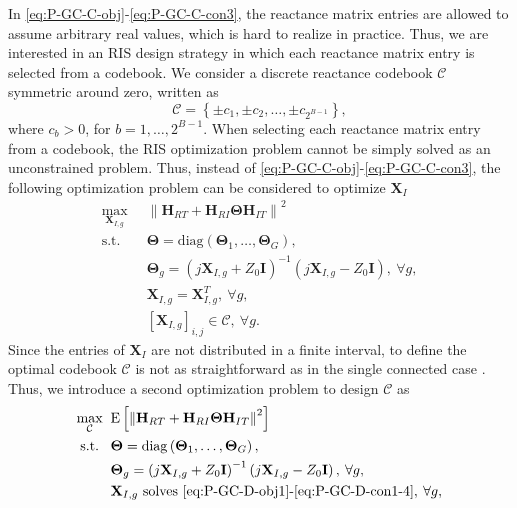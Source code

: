 \documentclass[twocolumn,10pt]{IEEEtran}
\begin{document}
In \eqref{eq:P-GC-C-obj}-\eqref{eq:P-GC-C-con3}, the reactance matrix entries are allowed to assume arbitrary real values, which is hard to realize in practice.
Thus, we are interested in an RIS design strategy in which each reactance matrix entry is selected from a codebook.
We consider a discrete reactance codebook $\mathcal{C}$ symmetric around zero, written as
\begin{equation}
\mathcal{C} = \left\{\pm c_{1},\pm c_{2},\ldots,\pm c_{2^{B-1}}\right\},\label{eq:codebook}
\end{equation}
where $c_{b}>0$, for $b=1,\ldots,2^{B-1}$.
When selecting each reactance matrix entry from a codebook, the RIS optimization problem cannot be simply solved as an unconstrained problem.
Thus, instead of \eqref{eq:P-GC-C-obj}-\eqref{eq:P-GC-C-con3}, the following optimization problem can be considered to optimize $\mathbf{X}_{I}$
\begin{align}
\underset{\mathbf{X}_{I,g}}{\mathsf{\mathrm{max}}}\;\;
& \left\|\mathbf{H}_{RT}+\mathbf{H}_{RI}\boldsymbol{\Theta}\mathbf{H}_{IT}\right\|^{2}\label{eq:P-GC-D-obj1}\\
\mathsf{\mathrm{s.t.}}\;\;\;
& \boldsymbol{\Theta}=\mathrm{diag}\left(\boldsymbol{\Theta}_{1},\ldots,\boldsymbol{\Theta}_{G}\right),\label{eq:P-GC-D-con1-1}\\
& \boldsymbol{\Theta}_{g}=\left(j\mathbf{X}_{I,g}+Z_{0}\mathbf{I}\right)^{-1}\left(j\mathbf{X}_{I,g}-Z_{0}\mathbf{I}\right),\:\forall g,\label{eq:P-GC-D-con1-2}\\
& \mathbf{X}_{I,g}=\mathbf{X}_{I,g}^{T},\:\forall g,\label{eq:P-GC-D-con1-3}\\
& \left[\mathbf{X}_{I,g}\right]_{i,j}\in\mathcal{C},\:\forall g.\label{eq:P-GC-D-con1-4}
\end{align}
Since the entries of $\mathbf{X}_{I}$ are not distributed in a finite interval, to define the optimal codebook $\mathcal{C}$ is not as straightforward as in the single connected case \cite{wu21}.
Thus, we introduce a second optimization problem to design $\mathcal{C}$ as
\begin{align}
\underset{\mathcal{C}}{\mathsf{\mathrm{max}}}\;\;
& \mathrm{E}\left[\left\|\mathbf{H}_{RT}+\mathbf{H}_{RI}\boldsymbol{\Theta}\mathbf{H}_{IT}\right\|^{2}\right]\label{eq:P-GC-D-obj2}\\
\mathsf{\mathrm{s.t.}}\;\;\;
& \boldsymbol{\Theta}=\mathrm{diag}\left(\boldsymbol{\Theta}_{1},\ldots,\boldsymbol{\Theta}_{G}\right),\label{eq:P-GC-D-con2-1}\\
& \boldsymbol{\Theta}_{g}=\left(j\mathbf{X}_{I,g}+Z_{0}\mathbf{I}\right)^{-1}\left(j\mathbf{X}_{I,g}-Z_{0}\mathbf{I}\right),\:\forall g,\label{eq:P-GC-D-con2-2}\\
& \mathbf{X}_{I,g}\text{ solves \eqref{eq:P-GC-D-obj1}-\eqref{eq:P-GC-D-con1-4}},\:\forall g,\label{eq:P-GC-D-con2-3}
\end{align}
\end{document}
